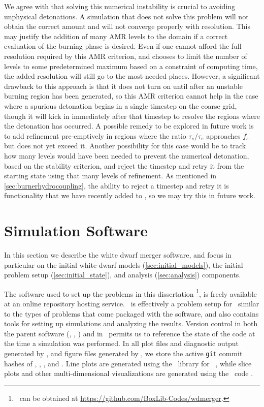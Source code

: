 \documentclass[12pt]{article}
\begin{document}
We agree with \citet{kushnir:2013} that solving this numerical
instability is crucial to avoiding unphysical detonations.
A simulation that does not solve this problem will not obtain
the correct amount and will not converge properly with resolution.
This may justify the addition of many AMR levels to the domain
if a correct evaluation of the burning phase is desired.
Even if one cannot afford the full resolution required by this
AMR criterion, and chooses to limit the number of levels to some
predetermined maximum based on a constraint of computing time,
the added resolution will still go to the most-needed places.
However, a significant drawback to this approach is that it
does not turn on until after an unstable burning region has
been generated, so this AMR criterion cannot help in the case
where a spurious detonation begins in a single timestep on the coarse
grid, though it will kick in immediately after that timestep
to resolve the regions where the detonation has occurred.
A possible remedy to be explored in future work is to add
refinement pre-emptively in regions where the ratio $\tau_s / \tau_e$
approaches $f_{s}$ but does not yet exceed it. Another
possibility for this case would be to track how many levels
would have been needed to prevent the numerical detonation,
based on the stability criterion, and reject the timestep and
retry it from the starting state using that many levels of refinement.
As mentioned in \autoref{sec:burnerhydrocoupling}, the ability to
reject a timestep and retry it is functionality that
we have recently added to \castro, so we may try this in future work.



\newpage
\section{Simulation Software}
\label{sec:software}

In this section we describe the white dwarf merger software, and focus in 
particular on the initial white dwarf models (\autoref{sec:initial_models}), 
the initial problem setup (\autoref{sec:initial_state}), and analysis 
(\autoref{sec:analysis}) components.

The software used to set up the problems in this dissertation
\wdmerger\footnote{\wdmerger\ can be obtained at \url{https://github.com/BoxLib-Codes/wdmerger}.},
is freely available at an online repository hosting service.
\wdmerger\ is effectively a problem setup for \castro\ similar to the types of
problems that come packaged with the software, and also contains tools for setting up
simulations and analyzing the results.
Version control in both the parent software (\boxlib, \castro, \microphysics) and in \wdmerger\
permits us to reference the state of the code at the time a simulation
was performed. In all plot files and diagnostic output generated by \castro, 
and figure files generated by \wdmerger,
we store the active \texttt{git} commit hashes of \boxlib, \castro, \microphysics, and \wdmerger.
Line plots are generated using the \matplotlib\ library for \python\ 
\citep{matplotlib}, while slice plots and other multi-dimensional visualizations are 
generated using the \yt\ code \citep{yt}.
\end{document}
